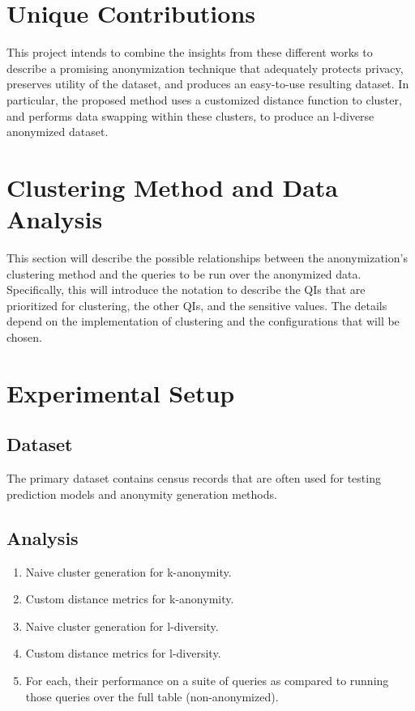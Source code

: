 \section{Unique Contributions}
This project intends to combine the insights from these different works to describe a promising anonymization technique that adequately protects privacy, preserves utility of the dataset, and produces an easy-to-use resulting dataset. In particular, the proposed method uses a customized distance function\cite{jiaPad} to cluster, and performs data swapping\cite{soriaSwapping} within these clusters, to produce an l-diverse\cite{machanavajjhalalDiversity} anonymized dataset.

\section{Clustering Method and Data Analysis}
This section will describe the possible relationships between the anonymization’s clustering method and the queries to be run over the anonymized data. Specifically, this will introduce the notation to describe the QIs that are prioritized for clustering, the other QIs, and the sensitive values. The details depend on the implementation of clustering and the configurations that will be chosen.

\section{Experimental Setup}

\subsection{Dataset}
The primary dataset\cite{adultDatabase} contains census records that are often used for testing prediction models and anonymity generation methods.

\subsection{Analysis}
\begin{enumerate}
    \item Naive cluster generation for k-anonymity.
    \item Custom distance metrics for k-anonymity.
    \item Naive cluster generation for l-diversity.
    \item Custom distance metrics for l-diversity.
    \item For each, their performance on a suite of queries as compared to running those queries over the full table (non-anonymized).
\end{enumerate}

